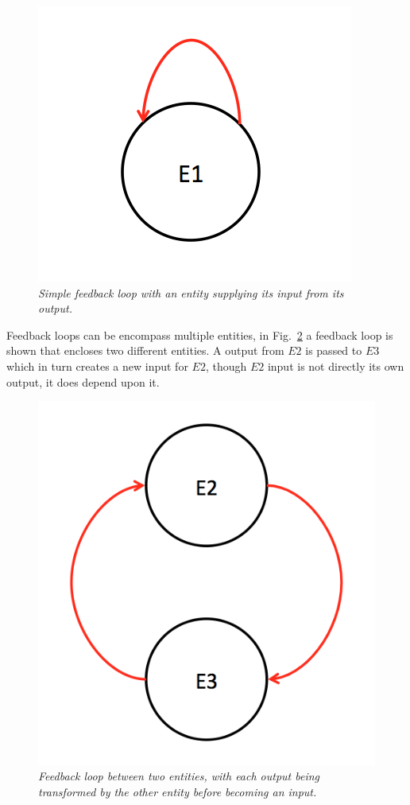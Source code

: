 \documentclass{article}
\begin{document}
\begin{figure}[H]
	\centering
	\includegraphics[scale=0.5]{selffeedback}
	\caption{\it Simple feedback loop with an entity supplying its input from its output.}
	\label{fig:exampleselffeedback}
\end{figure} 
Feedback loops can be encompass multiple entities, in Fig.~\ref{fig:exampletwofeedback} a feedback loop is shown that encloses two different entities. A output from $E2$ is passed to $E3$ which in turn creates a new input for $E2$, though $E2$ input is not directly its own output, it does depend upon it. 
\begin{figure}[H]
	\centering
	\includegraphics[scale=0.5]{twofeedback}
	\caption{\it Feedback loop between two entities, with each output being transformed by the other entity before becoming an input.}
	\label{fig:exampletwofeedback}
\end{figure} 
\end{document}
